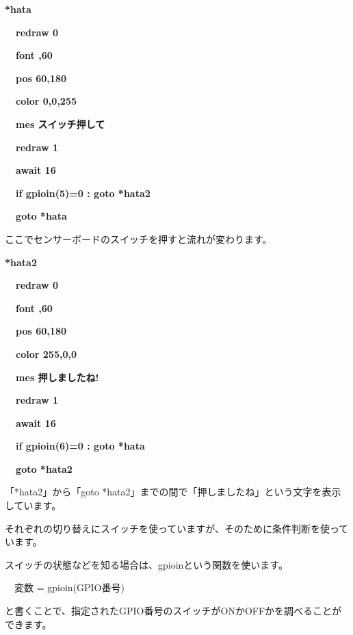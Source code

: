 \documentclass[a4paper,dvipdfmx]{jarticle}
\begin{document}
{\bfseries
*hata}

{\bfseries
\ \ redraw 0}

{\bfseries
\ \ font {\textquotedbl}{\textquotedbl},60}

{\bfseries
\ \ pos 60,180}

{\bfseries
\ \ color 0,0,255}

{\bfseries
\ \ mes {\textquotedbl}スイッチ押して{\textquotedbl}}

{\bfseries
\ \ redraw 1}

{\bfseries
\ \ await 16}

{\bfseries
\ \ if gpioin(5)=0 : goto *hata2}

{\bfseries
\ \ goto *hata}


\bigskip

ここでセンサーボードのスイッチを押すと流れが変わります。


\bigskip

{\bfseries
*hata2}

{\bfseries
\ \ redraw 0}

{\bfseries
\ \ font {\textquotedbl}{\textquotedbl},60}

{\bfseries
\ \ pos 60,180}

{\bfseries
\ \ color 255,0,0}

{\bfseries
\ \ mes {\textquotedbl}押しましたね!{\textquotedbl}}

{\bfseries
\ \ redraw 1}

{\bfseries
\ \ await 16}

{\bfseries
\ \ if gpioin(6)=0 : goto *hata}

{\bfseries
\ \ goto *hata2}


\bigskip

「*hata2」から「goto
*hata2」までの間で「押しましたね」という文字を表示しています。

それぞれの切り替えにスイッチを使っていますが、そのために条件判断を使っています。

スイッチの状態などを知る場合は、gpioinという関数を使います。


\bigskip

\ \ 変数 = gpioin(GPIO番号)


\bigskip

と書くことで、指定されたGPIO番号のスイッチがONかOFFかを調べることができます。


\bigskip
\end{document}
